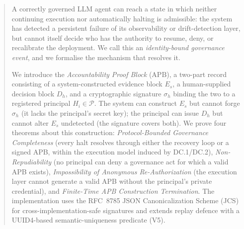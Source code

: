 \documentclass[11pt]{article}
\newcommand{\Pset}{\mathcal{P}}
\newcommand{\Es}{E_s}
\newcommand{\Dh}{D_h}
\newcommand{\sigh}{\sigma_h}
\newcommand{\Hi}{H_i}
\newcommand{\APB}{\mathrm{APB}}
\begin{document}
\begin{abstract}
\noindent
A correctly governed LLM agent can reach a state in which neither continuing
execution nor automatically halting is admissible: the system has detected a
persistent failure of its observability or drift-detection layer, but cannot
itself decide who has the authority to resume, deny, or recalibrate the
deployment. We call this an \emph{identity-bound governance event}, and we
formalise the mechanism that resolves it.

We introduce the \emph{Accountability Proof Block} ($\APB$), a two-part
record consisting of a system-constructed evidence block $\Es$, a
human-supplied decision block $\Dh$, and a cryptographic signature $\sigh$
binding the two to a registered principal $\Hi \in \Pset$. The system can
construct $\Es$ but cannot forge $\sigh$ (it lacks the principal's secret
key); the principal can issue $\Dh$ but cannot alter $\Es$ undetected (the
signature covers both).
We prove four theorems about this construction:
\emph{Protocol-Bounded Governance Completeness} (every halt resolves through
either the recovery loop or a signed APB, within the execution model
induced by DC.1/DC.2), \emph{Non-Repudiability} (no principal can
deny a governance act for which a valid APB exists),
\emph{Impossibility of Anonymous Re-Authorization} (the execution layer
cannot generate a valid APB without the principal's private credential),
and \emph{Finite-Time APB Construction Termination}.
The implementation uses the RFC~8785 JSON Canonicalization Scheme (JCS)
for cross-implementation-safe signatures and extends replay defence
with a UUID4-based semantic-uniqueness predicate (V5).


\end{abstract}
\end{document}
